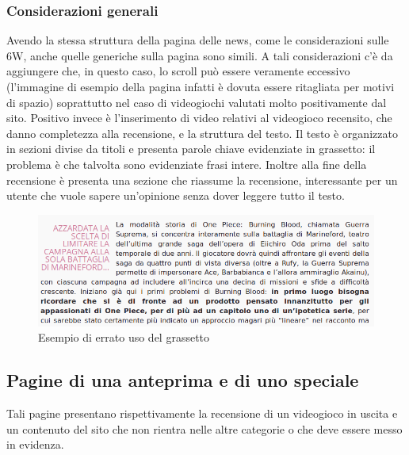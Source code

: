 \documentclass[../ProgettoTecWeb2.tex]{subfiles}
\begin{document}
		\subsubsection{Considerazioni generali}
		Avendo la stessa struttura della pagina delle news, come le considerazioni sulle 6W, anche quelle generiche sulla pagina sono simili. A tali considerazioni c'è da aggiungere che, in questo caso, lo scroll può essere veramente eccessivo (l'immagine di esempio della pagina infatti è dovuta essere ritagliata per motivi di spazio) soprattutto nel caso di videogiochi valutati molto positivamente dal sito. Positivo invece è l'inserimento di video relativi al videogioco recensito, che danno completezza alla recensione, e la struttura del testo. Il testo è organizzato in sezioni divise da titoli e presenta parole chiave evidenziate in grassetto: il problema è che talvolta sono evidenziate frasi intere. Inoltre alla fine della recensione è presenta una sezione che riassume la recensione, interessante per un utente che vuole sapere un'opinione senza dover leggere tutto il testo.
		\begin{figure} [H]
			\centering
			\includegraphics[scale=0.4]{img/ErratoUsoGrassetto}
			\caption{Esempio di errato uso del grassetto}
		\end{figure}

	\subsection{Pagine di una anteprima e di uno speciale}
	Tali pagine presentano rispettivamente la recensione di un videogioco in uscita e un contenuto del sito che non rientra nelle altre categorie o che deve essere messo in evidenza.
\end{document}
